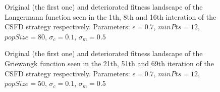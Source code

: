 \begin{figure}
  \centering
  \caption{Original (the first one) and deteriorated fitness landscape 
  of the Langermann function seen in the 1th, 8th and 16th interation 
  of the CSFD strategy respectively. 
  Parameters: $\epsilon=0.7$, $minPts=12$, $popSize=80$,
  $\sigma_c=0.1$, $\sigma_m=0.5$}
  \label{fig:langermannTest}
\end{figure}

\begin{figure}
  \centering
  \caption{Original (the first one) and deteriorated fitness landscape 
  of the Griewangk function seen in the 21th, 51th and 69th iteration 
  of the CSFD strategy respectively. 
  Parameters: $\epsilon=0.7$, $minPts=12$, $popSize=50$,
  $\sigma_c=0.1$, $\sigma_m=0.5$}
  \label{fig:griewangkTest}
\end{figure}
